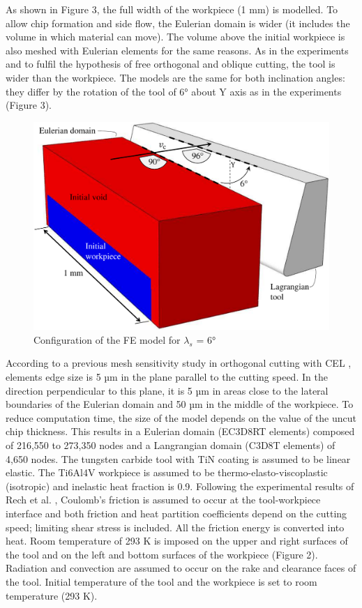 \documentclass[final,5p,times,twocolumn]{elsarticle}
\begin{document}
As shown in Figure 3, the full width of the workpiece (1 mm) is modelled. To allow chip formation and side flow, the Eulerian domain is wider (it includes the volume in which material can move). The volume above the initial workpiece is also meshed with Eulerian elements for the same reasons. As in the experiments and to fulfil the hypothesis of free orthogonal and oblique cutting, the tool is wider than the workpiece. The models are the same for both inclination angles: they differ by the rotation of the tool of 6° about Y axis as in the experiments (Figure 3).

\begin{figure}[h]
\centering
\includegraphics{Figures/FEConfig}
\caption{Configuration of the FE model for $\lambda_s$ = 6°}
\label{FEConfig}
\end{figure}

According to a previous mesh sensitivity study in orthogonal cutting with CEL \cite{ducobu_finite_2017}, elements edge size is 5 µm in the plane parallel to the cutting speed. In the direction perpendicular to this plane, it is 5 µm in areas close to the lateral boundaries of the Eulerian domain and 50 µm in the middle of the workpiece. To reduce computation time, the size of the model depends on the value of the uncut chip thickness. This results in a Eulerian domain (EC3D8RT elements) composed of 216,550 to 273,350 nodes and a Langrangian domain (C3D8T elements) of 4,650 nodes.
The tungsten carbide tool with TiN coating is assumed to be linear elastic. The Ti6Al4V workpiece is assumed to be thermo-elasto-viscoplastic (isotropic) and inelastic heat fraction is 0.9. Following the experimental results of Rech et al. \cite{rech_characterisation_2013}, Coulomb’s friction is assumed to occur at the tool-workpiece interface and both friction and heat partition coefficients depend on the cutting speed; limiting shear stress is included. All the friction energy is converted into heat. Room temperature of 293 K is imposed on the upper and right surfaces of the tool and on the left and bottom surfaces of the workpiece (Figure 2). Radiation and convection are assumed to occur on the rake and clearance faces of the tool. Initial temperature of the tool and the workpiece is set to room temperature (293 K).
\end{document}
